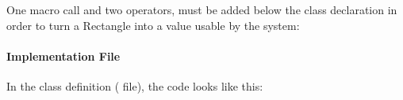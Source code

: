 \documentclass[letterpaper,10pt,english]{sphinxmanual}
\renewcommand{\sphinxcode}[1]{\texttt{\small{#1}}}
\begin{document}
One macro call and two operators, must be added below the class declaration in
order to turn a Rectangle into a value usable by the \sphinxcode{} system:

\begin{sphinxVerbatim}[commandchars=\\\{\}]
       
      

 
\end{sphinxVerbatim}


\paragraph{Implementation File}
\label{\detokenize{attributes:implementation-file}}
In the class definition (\sphinxcode{} file), the code looks like this:
\end{document}
